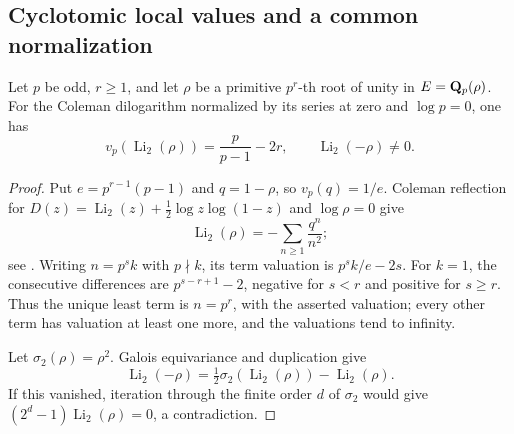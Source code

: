 \subsection{Cyclotomic local values and a common normalization}
\label{d3:sec:cyclotomicnormalization}


\begin{lemma}\label{d3:lem:cyclotomicdilognonzero}
Let $p$ be odd, $r\geq1$, and let $\rho$ be a primitive $p^r$-th
root of unity in $E=\mathbf Q_p(\rho)$. For the Coleman dilogarithm
normalized by its series at zero and $\log p=0$, one has
\[
 v_p(\operatorname{Li}_2(\rho))
 =\frac p{p-1}-2r,\qquad
 \operatorname{Li}_2(-\rho)\ne0.
\]
\end{lemma}
\begin{proof}
Put $e=p^{r-1}(p-1)$ and $q=1-\rho$, so $v_p(q)=1/e$.
Coleman reflection for
$D(z)=\operatorname{Li}_2(z)+\frac12\log z\log(1-z)$
and $\log\rho=0$ give
\[
 \operatorname{Li}_2(\rho)
 =-\sum_{n\geq1}\frac{q^n}{n^2};
\]
see \cite[p.~377]{BesserDeJeuCurves}.
Writing $n=p^sk$ with $p\nmid k$, its term valuation is
$p^sk/e-2s$. For $k=1$, the consecutive differences are
$p^{s-r+1}-2$, negative for $s<r$ and positive for $s\geq r$.
Thus the unique least term is $n=p^r$, with the asserted
valuation; every other term has valuation at least one more,
and the valuations tend to infinity.

Let $\sigma_2(\rho)=\rho^2$. Galois equivariance and duplication
\cite[Remark~2.3 and equation~(2.4)]{BesserDeJeu} give
\[
 \operatorname{Li}_2(-\rho)
 =\tfrac12\sigma_2(\operatorname{Li}_2(\rho))
       -\operatorname{Li}_2(\rho).
\]
If this vanished, iteration through the finite order $d$ of
$\sigma_2$ would give
$(2^d-1)\operatorname{Li}_2(\rho)=0$, a contradiction.
\end{proof}

